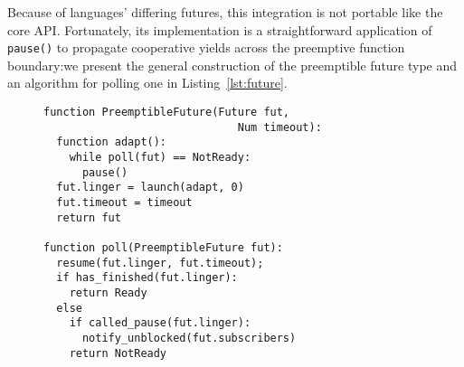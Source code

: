 Because
of languages' differing futures, this integration is not portable like the core API.
Fortunately, its implementation is a straightforward application of
\texttt{pause()} to propagate cooperative yields across the preemptive function
boundary:\@ we present the general construction of the preemptible future
type and an algorithm for polling one in Listing~\ref{lst:future}.

\begin{figure}
\begin{lstlisting}[label=lst:future,caption=Futures adapter type (pseudocode)]
function PreemptibleFuture(Future fut,
                              Num timeout):
  function adapt():
    while poll(fut) == NotReady:
      pause()
  fut.linger = launch(adapt, 0)
  fut.timeout = timeout
  return fut

function poll(PreemptibleFuture fut):
  resume(fut.linger, fut.timeout);
  if has_finished(fut.linger):
    return Ready
  else
    if called_pause(fut.linger):
      notify_unblocked(fut.subscribers)
    return NotReady
\end{lstlisting}
\end{figure}
